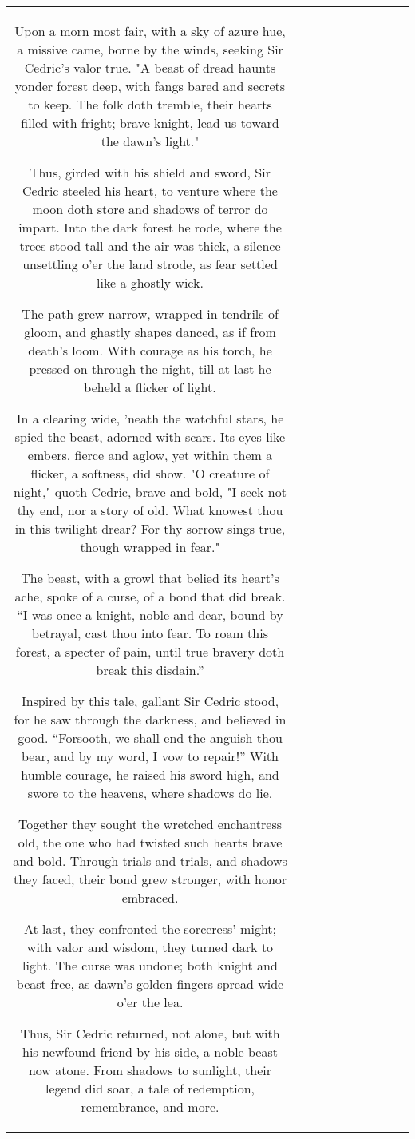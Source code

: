 \begin{table}[h!]
\begin{tabular}{|c|c|c|c|c|c|c|c|c|c|}
Upon a morn most fair, with a sky of azure hue, a missive came, borne by the winds, seeking Sir Cedric’s valor true. "A beast of dread haunts yonder forest deep, with fangs bared and secrets to keep. The folk doth tremble, their hearts filled with fright; brave knight, lead us toward the dawn’s light."

Thus, girded with his shield and sword, Sir Cedric steeled his heart, to venture where the moon doth store and shadows of terror do impart. Into the dark forest he rode, where the trees stood tall and the air was thick, a silence unsettling o’er the land strode, as fear settled like a ghostly wick.

The path grew narrow, wrapped in tendrils of gloom, and ghastly shapes danced, as if from death's loom. With courage as his torch, he pressed on through the night, till at last he beheld a flicker of light.

In a clearing wide, 'neath the watchful stars, he spied the beast, adorned with scars. Its eyes like embers, fierce and aglow, yet within them a flicker, a softness, did show. "O creature of night," quoth Cedric, brave and bold, "I seek not thy end, nor a story of old. What knowest thou in this twilight drear? For thy sorrow sings true, though wrapped in fear."

The beast, with a growl that belied its heart's ache, spoke of a curse, of a bond that did break. “I was once a knight, noble and dear, bound by betrayal, cast thou into fear. To roam this forest, a specter of pain, until true bravery doth break this disdain.”

Inspired by this tale, gallant Sir Cedric stood, for he saw through the darkness, and believed in good. “Forsooth, we shall end the anguish thou bear, and by my word, I vow to repair!” With humble courage, he raised his sword high, and swore to the heavens, where shadows do lie.

Together they sought the wretched enchantress old, the one who had twisted such hearts brave and bold. Through trials and trials, and shadows they faced, their bond grew stronger, with honor embraced.

At last, they confronted the sorceress’ might; with valor and wisdom, they turned dark to light. The curse was undone; both knight and beast free, as dawn's golden fingers spread wide o'er the lea.

Thus, Sir Cedric returned, not alone, but with his newfound friend by his side, a noble beast now atone. From shadows to sunlight, their legend did soar, a tale of redemption, remembrance, and more.


\end{tabular}
\end{table}
